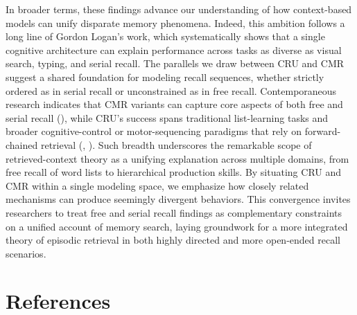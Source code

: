 \documentclass[
  man,
  floatsintext,
  longtable,
  nolmodern,
  notxfonts,
  notimes,
  draftfirst,
  colorlinks=true,linkcolor=blue,citecolor=blue,urlcolor=blue]{apa7}
\begin{document}
In broader terms, these findings advance our understanding of how
context-based models can unify disparate memory phenomena. Indeed, this
ambition follows a long line of Gordon Logan's work, which
systematically shows that a single cognitive architecture can explain
performance across tasks as diverse as visual search, typing, and serial
recall. The parallels we draw between CRU and CMR suggest a shared
foundation for modeling recall sequences, whether strictly ordered as in
serial recall or unconstrained as in free recall. Contemporaneous
research indicates that CMR variants can capture core aspects of both
free and serial recall (), while CRU's success spans traditional list-learning tasks and
broader cognitive-control or motor-sequencing paradigms that rely on
forward-chained retrieval (, ). Such breadth underscores
the remarkable scope of retrieved-context theory as a unifying
explanation across multiple domains, from free recall of word lists to
hierarchical production skills. By situating CRU and CMR within a single
modeling space, we emphasize how closely related mechanisms can produce
seemingly divergent behaviors. This convergence invites researchers to
treat free and serial recall findings as complementary constraints on a
unified account of memory search, laying groundwork for a more
integrated theory of episodic retrieval in both highly directed and more
open-ended recall scenarios.

\section{References}\label{references}
\end{document}
